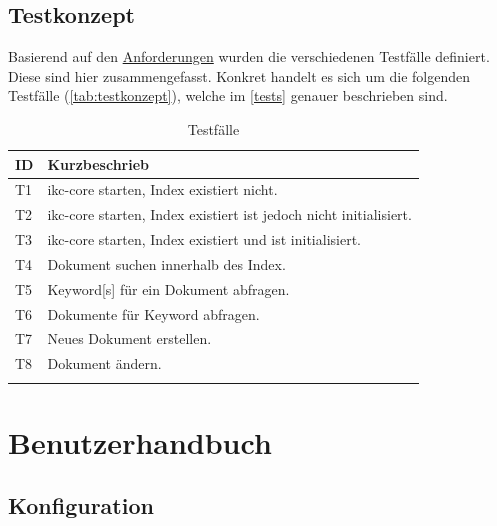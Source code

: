 \subsection{Testkonzept}
Basierend auf den \hyperref[anforderungen]{Anforderungen} wurden die verschiedenen Testfälle definiert. Diese sind hier zusammengefasst. Konkret handelt es sich um die folgenden Testfälle (\autoref{tab:testkonzept}), welche im \autoref{tests} genauer beschrieben sind.

\begin{longtable}{|p{1cm} | P{6cm} |}
  \hline
    ID & Kurzbeschrieb \\\hline
    T1 & \gls{ikc-core} starten, Index existiert nicht.\\\hline
    T2 & \gls{ikc-core} starten, Index existiert ist jedoch nicht initialisiert.\\\hline
    T3 & \gls{ikc-core} starten, Index existiert und ist initialisiert.\\\hline
    T4 & Dokument suchen innerhalb des Index.\\\hline
    T5 & \gls{Keyword}[s] für ein Dokument abfragen.\\\hline
    T6 & Dokumente für \gls{Keyword} abfragen.\\\hline
    T7 & Neues Dokument erstellen.\\\hline
    T8 & Dokument ändern.\\\hline
    \caption{Testfälle}
  \label{tab:testkonzept}
\end{longtable}

\section{Benutzerhandbuch}\label{tutorial}

\subsection{Konfiguration}

